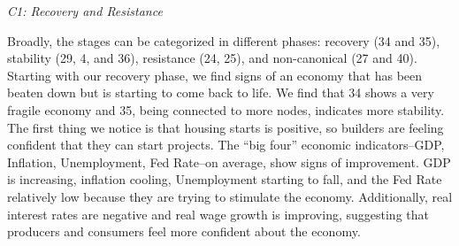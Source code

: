 \documentclass[10pt, letterpaper]{article}
\begin{document}
\emph{C1: Recovery and Resistance}

Broadly, the stages can be categorized in different phases: recovery (34
and 35), stability (29, 4, and 36), resistance (24, 25), and
non-canonical (27 and 40). Starting with our recovery phase, we find
signs of an economy that has been beaten down but is starting to come
back to life. We find that 34 shows a very fragile economy and 35, being
connected to more nodes, indicates more stability. The first thing we
notice is that housing starts is positive, so builders are feeling
confident that they can start projects. The ``big four'' economic
indicators--GDP, Inflation, Unemployment, Fed Rate--on average, show
signs of improvement. GDP is increasing, inflation cooling, Unemployment
starting to fall, and the Fed Rate relatively low because they are
trying to stimulate the economy. Additionally, real interest rates are
negative and real wage growth is improving, suggesting that producers
and consumers feel more confident about the economy.
\end{document}
